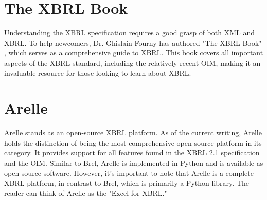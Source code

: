 
\section{The XBRL Book}
Understanding the XBRL specification requires a good grasp of both XML and XBRL.
To help newcomers, Dr. Ghislain Fourny has authored "The XBRL Book" \cite{fourny2023xbrl}, 
which serves as a comprehensive guide to XBRL. This book covers all important aspects of the XBRL standard, including the relatively recent OIM, 
making it an invaluable resource for those looking to learn about XBRL.

\section{Arelle}
Arelle\cite{arelle} stands as an open-source XBRL platform. 
As of the current writing, Arelle holds the distinction of being the most comprehensive open-source platform in its category. 
It provides support for all features found in the XBRL 2.1 specification and the OIM. 
Similar to Brel, Arelle is implemented in Python and is available as open-source software. 
However, it's important to note that Arelle is a complete XBRL platform, in contrast to Brel, which is primarily a Python library. 
The reader can think of Arelle as the "Excel for XBRL."

